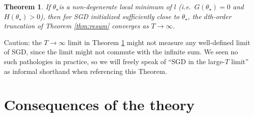 \documentclass[final,12pt]{colt2021} %
\newtheorem{thm}{Theorem}
\begin{document}
     
            \begin{thm} \label{thm:converge}
                If $\theta_\star$is a non-degenerate local minimum of $l$ (i.e.\
                $G(\theta_\star)=0$ and $H(\theta_\star) > 0$), then for SGD
                initialized sufficiently close to $\theta_\star$, the $d$th-order
                truncation of Theorem \ref{thm:resum} converges as $T\to \infty$.
            \end{thm}
            \par\noindent
            Caution: the $T\to \infty$ limit in Theorem \ref{thm:converge}
            might not measure any well-defined limit of SGD, since the limit
            might not commute with the infinite sum.  We seen no such
            pathologies in practice, so we will freely speak of ``SGD in the
            large-$T$ limit'' as informal shorthand when referencing this
            Theorem.

    \section{Consequences of the theory}
\end{document}
